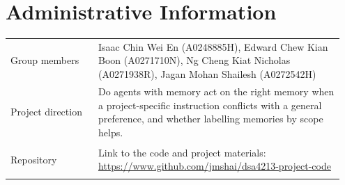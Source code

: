 \section*{Administrative Information}

\begin{tabular}{@{}>{\bfseries\raggedright\arraybackslash}p{0.25\linewidth}
                    >{\raggedright\arraybackslash}p{0.70\linewidth}@{}}
Group members & Isaac Chin Wei En (A0248885H),
Edward Chew Kian Boon (A0271710N),
Ng Cheng Kiat Nicholas (A0271938R),
Jagan Mohan Shailesh (A0272542H) \\[0.7em]
Project direction & Do agents with memory act on the right memory when a
project-specific instruction conflicts with a general preference,
and whether labelling memories by scope helps. \\[0.7em]
Repository & Link to the code and project materials: \url{https://www.github.com/jmshai/dsa4213-project-code} \\
\end{tabular}
